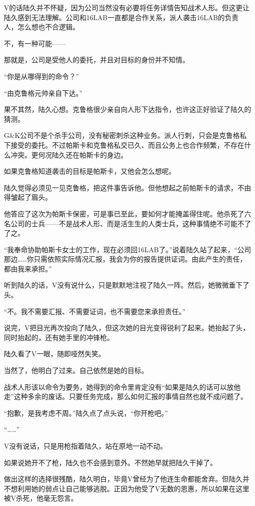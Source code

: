 V的话陆久并不怀疑，因为公司当然没有必要将任务详情告知战术人形。但这更让陆久感到无法理解。公司和16LAB一直都是合作关系，派人袭击16LAB的负责人，怎么想也不合逻辑。

不，有一种可能—— 

那就是，公司是受他人的委托，并且对目标的身份并不知情。

“你是从哪得到的命令？”

“由克鲁格元帅亲自下达。”

果不其然，陆久心想。克鲁格很少亲自向人形下达指令，也许这正好验证了陆久的猜测。

G\&K公司不是个杀手公司，没有秘密刺杀这种业务。派人行刺，只会是克鲁格私下接受的委托。不过帕斯卡和克鲁格私交已久、而且公务上也合作频繁，不存在什么冲突。更何况陆久还在帕斯卡的身边。

如果克鲁格知道袭击的目标是帕斯卡，又他会怎么想呢。

陆久觉得必须见一见克鲁格，把这件事告诉他。但他想起之前帕斯卡的请求，不由得皱起了眉头。

他答应了这次为帕斯卡保密，可是事已至此，要如何才能掩盖得住呢。他杀死了六名公司的士兵——不是战术人形、而是活生生的人类士兵，这种事情绝不可能不了了之。

“我奉命协助帕斯卡女士的工作，现在必须回16LAB了。”说着陆久站了起来，“公司那边……你只需依照实际情况汇报，我会为你的报告提供证词。由此产生的责任，都由我来承担。”

听到陆久的话，V没有说什么，只是默默地注视了陆久一阵。然后，她微微垂下了头。

“不。我不需要汇报、不需要证词，也不需要您来承担责任。”

说完，V把目光再次投向了陆久，但这次她的目光变得锐利了起来。她抬起了头，同时抬起的，还有她手里的冲锋枪。

陆久看了V一眼，随即哑然失笑。

当然了，他明白了过来。自己依然是她的目标。

战术人形该以命令为要务，她得到的命令里肯定没有“如果是陆久的话可以放他走”这种多余的废话。只要任务完成，那么如何汇报的事情自然也就不成问题了。

 “抱歉，是我考虑不周。”陆久点了点头说，“你开枪吧。”

“……”

V没有说话，只是用枪指着陆久，站在原地一动不动。

如果说她开不了枪，陆久也不会感到意外。不然她早就把陆久干掉了。

做出这样的选择很残酷，陆久明白，毕竟V曾经为了他连生命都能舍弃。但陆久并不想利用她的弱点让自己能够逃脱。正因为他受了V无数的恩惠，所以如果在这里被V杀死，他毫无怨言。

